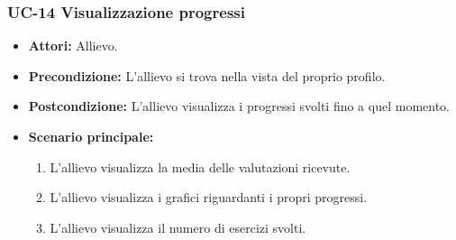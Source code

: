 	\subsubsection{UC-14 Visualizzazione progressi}
	\begin{itemize}
			\item \textbf{Attori:} Allievo.
			\item \textbf{Precondizione:} L'allievo si trova nella vista del proprio profilo.
			\item \textbf{Postcondizione:} L'allievo visualizza i progressi svolti fino a quel momento.
			\item \textbf{Scenario principale:}
				\begin{enumerate}
					\item L'allievo visualizza la media delle valutazioni ricevute.
					\item L'allievo visualizza i grafici riguardanti i propri progressi.
					\item L'allievo visualizza il numero di esercizi svolti.
				\end{enumerate}
	\end{itemize}